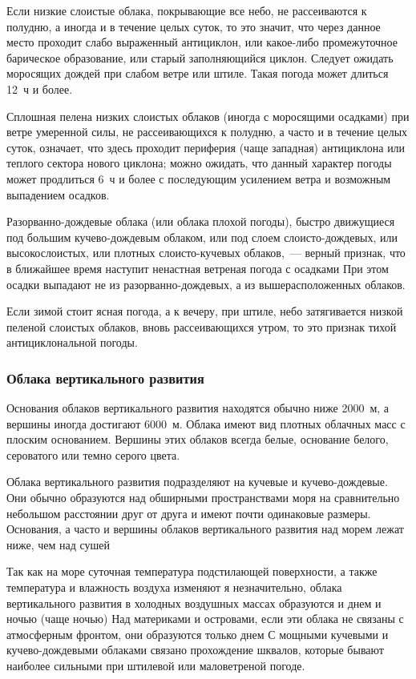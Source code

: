  Если низкие слоистые облака, покрывающие все небо, не
рассеиваются к полудню, а иногда и в течение целых суток, то это
значит, что через данное место проходит слабо выраженный антициклон,
или какое-либо промежуточное барическое образование, или старый
заполняющийся циклон. Следует ожидать моросящих дождей при слабом
ветре или штиле. Такая погода может длиться 12~ч и более.

 Сплошная пелена низких слоистых облаков (иногда с моросящими
осадками) при ветре умеренной силы, не рассеивающихся к полудню, а
часто и в течение целых суток, означает, что здесь проходит периферия
(чаще западная) антициклона или теплого сектора нового циклона; можно
ожидать, что данный характер погоды может продлиться 6~ч и более с
последующим усилением ветра и возможным выпадением осадков.

 Разорванно-дождевые облака (или облака плохой погоды), быстро
движущиеся под большим кучево-дождевым облаком, или под слоем
слоисто-дождевых, или высокослоистых, или плотных слоисто-кучевых
облаков,~--- верный признак, что в ближайшее время наступит ненастная
ветреная погода с осадками При этом осадки выпадают не из
разорванно-дождевых, а из вышерасположенных облаков.

 Если зимой стоит ясная погода, а к вечеру, при штиле, небо
затягивается низкой пеленой слоистых облаков, вновь рассеивающихся
утром, то это признак тихой антициклональной погоды.

\subsubsection{Облака вертикального развития}

Основания облаков вертикального развития находятся обычно ниже 2000~м,
а вершины иногда достигают 6000~м. Облака имеют вид плотных
облачных масс с плоским основанием. Вершины этих облаков всегда белые,
основание белого, сероватого или темно серого цвета.

Облака вертикального развития подразделяют на кучевые и
кучево-дождевые. Они обычно образуются над обширными пространствами
моря на сравнительно небольшом расстоянии друг от друга и имеют почти
одинаковые размеры. Основания, а часто и вершины облаков вертикального
развития над морем лежат ниже, чем над сушей

Так как на море суточная температура подстилающей поверхности, а также
температура и влажность воздуха изменяют я незначительно, облака
вертикального развития в холодных воздушных массах образуются и днем и
ночью (чаще ночью) Над материками и островами, если эти облака не
связаны с атмосферным фронтом, они образуются только днем С мощными
кучевыми и кучево-дождевыми облаками связано прохождение шквалов,
которые бывают наиболее сильными при штилевой или маловетреной погоде.

